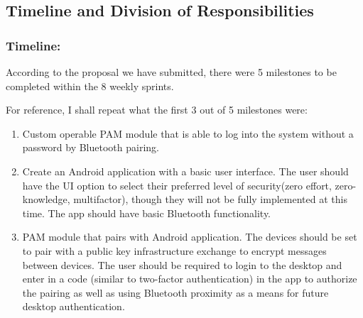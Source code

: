 \documentclass[letterpaper,twocolumn,10pt]{article}
\begin{document}
{{\subsection{Timeline and Division of Responsibilities}
\subsubsection{Timeline:}
According to the proposal we have submitted, there were 5 milestones to be completed within the 8 weekly sprints. 

For reference, I shall repeat what the first 3 out of 5 milestones were:
\begin{singlespace}
\begin{enumerate}[noitemsep]
\item Custom operable PAM module that is able to log into the system without a password by Bluetooth pairing.

\item Create an Android application with a basic user interface. The user should have the UI option to select their preferred level of security(zero effort, zero-knowledge, multifactor), though they will not be fully implemented at this time. The app should have basic Bluetooth functionality.  

\item PAM module that pairs with Android application.  The devices should be set to pair with a public key infrastructure exchange to encrypt messages between devices. The user should be required to login to the desktop and enter in a code (similar to two-factor authentication) in the app to authorize the pairing as well as using Bluetooth proximity as a means for future desktop authentication.
\end{enumerate}
\end{singlespace}

}}
\end{document}
